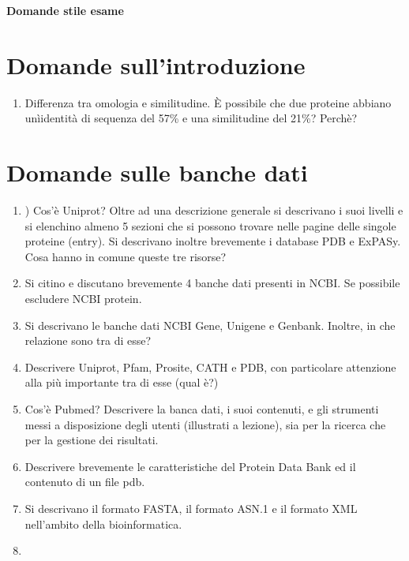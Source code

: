\documentclass{article}
\begin{document}
\begin{titlepage}
    \begin{center}
        \vspace*{1cm}
        \LARGE
        \textbf{Domande stile esame}

    \end{center}
\end{titlepage}

\section{Domande sull'introduzione}
\Large
\begin{enumerate}
    \item Differenza tra omologia e similitudine. È possibile che due proteine abbiano unìidentità di sequenza del 57\% e una similitudine del 21\%? Perchè?
\end{enumerate}

\section{Domande sulle banche dati}
\begin{enumerate}
    \item ) Cos'è Uniprot? Oltre ad una descrizione generale si descrivano i suoi livelli e si elenchino almeno 5 sezioni che si possono trovare nelle pagine delle singole proteine (entry). Si descrivano inoltre brevemente i database PDB e ExPASy. Cosa hanno in comune queste tre risorse?
    \item Si citino e discutano brevemente 4 banche dati presenti in NCBI. Se possibile escludere NCBI protein.
    \item Si descrivano le banche dati NCBI Gene, Unigene e Genbank. Inoltre, in che relazione sono tra di esse?
    \item  Descrivere Uniprot, Pfam, Prosite, CATH e PDB, con particolare attenzione alla più importante tra di esse (qual è?)
    \item Cos'è Pubmed? Descrivere la banca dati, i suoi contenuti, e gli strumenti messi a disposizione degli utenti (illustrati a lezione), sia per la ricerca che per la gestione dei risultati.
    \item Descrivere brevemente le caratteristiche del Protein Data Bank ed il contenuto di un file pdb.
    \item Si descrivano il formato FASTA, il formato ASN.1 e il formato XML nell'ambito della bioinformatica.
    \item 
\end{enumerate}
\end{document}
